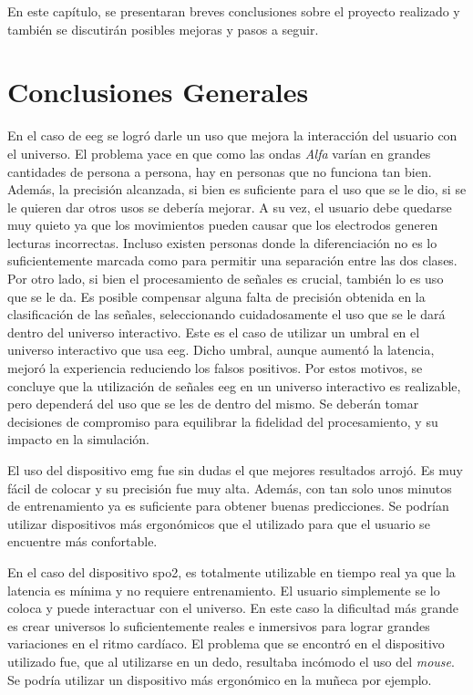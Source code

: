 En este capítulo, se presentaran breves conclusiones sobre el proyecto realizado y también se discutirán posibles mejoras y pasos a seguir.

\section{Conclusiones Generales}

En el caso de \acrshort{eeg} se logró darle un uso que mejora la interacción del usuario con el universo. El problema yace en que como las ondas \emph{Alfa} varían en grandes cantidades de persona a persona, hay en personas que no funciona tan bien. Además, la precisión alcanzada, si bien es suficiente para el uso que se le dio, si se le quieren dar otros usos se debería mejorar. A su vez, el usuario debe quedarse muy quieto ya que los movimientos pueden causar que los electrodos generen lecturas incorrectas. Incluso existen personas donde la diferenciación no es lo suficientemente marcada como para permitir una separación entre las dos clases. Por otro lado, si bien el procesamiento de señales es crucial, también lo es uso que se le da. Es posible compensar alguna falta de precisión obtenida en la clasificación de las señales, seleccionando cuidadosamente el uso que se le dará dentro del universo interactivo. Este es el caso de utilizar un umbral en el universo interactivo que usa \acrshort{eeg}. Dicho umbral, aunque aumentó la latencia, mejoró la experiencia reduciendo los falsos positivos. Por estos motivos, se concluye que la utilización de señales \acrshort{eeg} en un universo interactivo es realizable, pero dependerá del uso que se les de dentro del mismo. Se deberán tomar decisiones de compromiso para equilibrar la fidelidad del procesamiento, y su impacto en la simulación.

El uso del dispositivo \acrshort{emg} fue sin dudas el que mejores resultados arrojó. Es muy fácil de colocar y su precisión fue muy alta. Además, con tan solo unos minutos de entrenamiento ya es suficiente para obtener buenas predicciones. Se podrían utilizar dispositivos más ergonómicos que el utilizado para que el usuario se encuentre más confortable.

En el caso del dispositivo \acrshort{spo2}, es totalmente utilizable en tiempo real ya que la latencia es mínima y no requiere entrenamiento. El usuario simplemente se lo coloca y puede interactuar con el universo. En este caso la dificultad más grande es crear universos lo suficientemente reales e inmersivos para lograr grandes variaciones en el ritmo cardíaco. El problema que se encontró en el dispositivo utilizado fue, que al utilizarse en un dedo, resultaba incómodo el uso del \emph{mouse}. Se podría utilizar un dispositivo más ergonómico en la muñeca por ejemplo.

